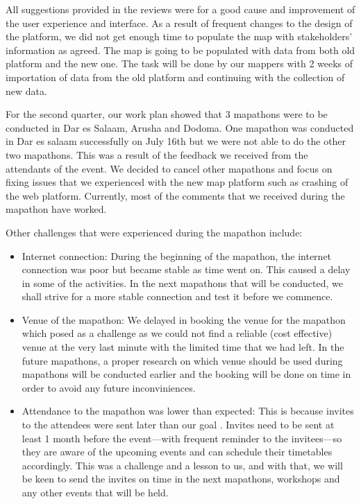 \documentclass[a4paper,12pt,twoside]{article}
\begin{document}
All suggestions provided in the reviews were for a good cause and improvement of the user experience and interface. As a result of frequent changes to the design of the platform, we did not get enough time to populate the map with stakeholders’ information as agreed. The map is going to be populated with data from both old platform and the new one. The task will be done by our mappers with 2 weeks of importation of data from the old platform and continuing with the collection of new data.

\textbf{\color{OMDTZblue}{Mapathon}}

For the second quarter, our work plan showed that 3 mapathons were to be conducted in Dar es Salaam, Arusha and Dodoma. One mapathon was conducted in Dar es salaam successfully on July 16th but we were not able to do the other two mapathons. This was a result of the feedback we received from the attendants of the event. We decided to cancel other mapathons and focus on fixing issues that we experienced with the new map platform such as crashing of the web platform. Currently, most of the comments that we received during the mapathon have worked.

Other challenges that were experienced during the mapathon include:
\begin{itemize}
    \item {\color{OMDTZblue}Internet connection:} During the beginning of the mapathon, the internet connection was poor but became stable as time went on. This caused a delay in some of the activities. In the next mapathons that will be conducted, we shall strive for a more stable connection and test it before we commence.
    
    \item {\color{OMDTZblue}Venue of the mapathon:} We delayed in booking the venue for the mapathon which posed as a challenge as we could not find a reliable (cost effective) venue at the very last minute with the limited time that we had left. In the future mapathons, a proper research on which venue should be used during mapathons will be conducted earlier and the booking will be done on time in order to avoid any future inconviniences.
    
    \item {\color{OMDTZblue}Attendance to the mapathon was lower than expected:} This is because invites to the attendees were sent later than our goal . Invites need to be sent at least 1 month before the event---with frequent reminder to the invitees---so they are aware of the upcoming events and can schedule their timetables accordingly. This was a challenge and a lesson to us, and with that, we will be keen to send the invites on time in the next mapathons, workshops and any other events that will be held.
\end{itemize}
\end{document}
